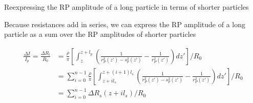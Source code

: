 \begin{frame}[c]{Reexpressing the RP amplitude of a long particle in terms of shorter particles}
	
	
	{\footnotesize
	Because resistances add in series, we can express the RP amplitude of a long particle as a sum over the RP amplitudes of shorter particles
	}
	
	
	{\scriptsize
		\begin{equation*}
			\begin{split}
				\frac{\Delta I}{I_{p}}=\frac{\Delta R_{l}}{R_{0}} &= \frac{\rho}{\pi}\left[\int_{z}^{z+l_{p}}\left(\frac{1}{r_{P}^{2}\left(z'\right)-s_{p}^{2}\left(z'\right)}-\frac{1}{r_{P}^{2}\left(z'\right)}\right)dz'\right]/R_{0} \\
				&= \sum_{i=0}^{n-1}\frac{\rho}{\pi}\left[\int_{z+il_{s}}^{z+\left(i+1\right)l_{s}}\left(\frac{1}{r^{2}_{P}\left(z'\right)-s^{2}_{p}\left(z'\right)}-\frac{1}{r_{P}^{2}\left(z'\right)}\right)dz'\right]/R_{0} \\
				&= \sum_{i=0}^{n-1}\Delta R_{s}\left(z+il_{s}\right)/R_{0}
			\end{split}
		\end{equation*}
	}
		

\end{frame}






